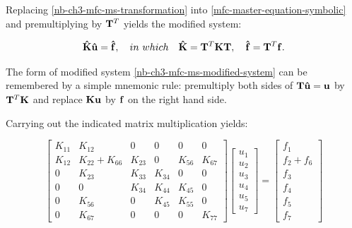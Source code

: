 Replacing \eqref{nb-ch3-mfc-ms-transformation} into \eqref{mfc-master-equation-symbolic} and
premultiplying by $ \mathbf{T}^T $ yields the modified system:

\begin{equation}\label{nb-ch3-mfc-ms-modified-system}
    \mathbf{\hat{K}} \mathbf{\hat{u}} = \mathbf{\hat{f}}, \quad
    in\ which \quad \mathbf{\hat{K}} = \mathbf{T}^T \mathbf{K} \mathbf{T}, \quad
    \mathbf{\hat{f}} = \mathbf{T}^T \mathbf{f}.
\end{equation}

\begin{bbox}
    The form of modified system \eqref{nb-ch3-mfc-ms-modified-system} can be remembered
    by a simple mnemonic rule: premultiply both sides of $
    \mathbf{T} \mathbf{\hat{u}} = \mathbf{u} $
    by $ \mathbf{T}^T \mathbf{K} $ and replace $ \mathbf{K} \mathbf{u} $ by
    $ \mathbf{f} $ on the right hand side.
\end{bbox}

Carrying out the indicated matrix multiplication yields:

\begin{equation}\label{nb-ch3-mfc-ms-modified-master}
    \begin{bmatrix}
        K_{11} & K_{12} & 0 & 0 & 0 & 0 \\
        K_{12} & K_{22} + K_{66} & K_{23} & 0 & K_{56} & K_{67} \\
        0 & K_{23} & K_{33} & K_{34} & 0 & 0 \\
        0 & 0 & K_{34} & K_{44} & K_{45} & 0 \\
        0 & K_{56} & 0 & K_{45} & K_{55} & 0 \\
        0 & K_{67} & 0 & 0 & 0 & K_{77}
    \end{bmatrix}
    \begin{bmatrix}
        u_1 \\
        u_2 \\
        u_3 \\
        u_4 \\
        u_5 \\
        u_7
    \end{bmatrix}
    = \begin{bmatrix}
        f_1 \\
        f_2 + f_6 \\
        f_3 \\
        f_4 \\
        f_5 \\
        f_7
    \end{bmatrix}
\end{equation}

